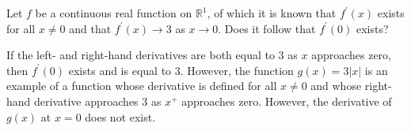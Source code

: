 \begin{exercise}
	Let $f$ be a continuous real function on $\mathbb{R}^1$, of which it is known that $f^\prime(x)$ exists for all $x \neq 0$ and that $f^\prime(x) \to 3$ as $x \to 0$. Does it follow that $f^\prime(0)$ exists?
\end{exercise}
\begin{solution}
	If the left- and right-hand derivatives are both equal to $3$ as $x$ approaches zero, then $f^\prime(0)$ exists and is equal to $3$. However, the function $g(x) = 3 \left| x \right|$ is an example of a function whose derivative is defined for all $x \neq 0$ and whose right-hand derivative approaches $3$ as $x^+$ approaches zero. However, the derivative of $g(x)$ at $x = 0$ does not exist.
\end{solution}
